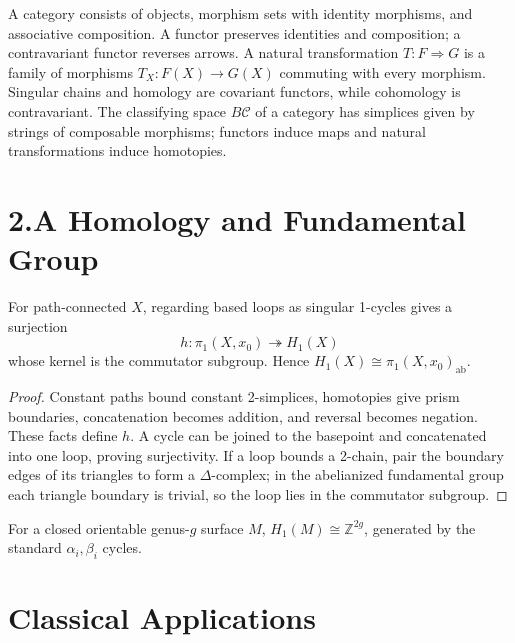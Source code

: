 A category consists of objects, morphism sets with identity morphisms, and associative composition.  A functor preserves identities and composition; a contravariant functor reverses arrows.  A natural transformation $T:F\Rightarrow G$ is a family of morphisms $T_X:F(X)\to G(X)$ commuting with every morphism.  Singular chains and homology are covariant functors, while cohomology is contravariant.  The classifying space $B\mathcal C$ of a category has simplices given by strings of composable morphisms; functors induce maps and natural transformations induce homotopies.

\section{2.A Homology and Fundamental Group}

\begin{theorem}
\label{thm:hurewicz-dimension-1}
For path-connected $X$, regarding based loops as singular 1-cycles gives a surjection
\[
h:\pi_1(X,x_0)\twoheadrightarrow H_1(X)
\]
whose kernel is the commutator subgroup.  Hence $H_1(X)\cong\pi_1(X,x_0)_{\mathrm{ab}}$.
\end{theorem}
\begin{proof}
\sketch Constant paths bound constant 2-simplices, homotopies give prism boundaries, concatenation becomes addition, and reversal becomes negation.  These facts define $h$.  A cycle can be joined to the basepoint and concatenated into one loop, proving surjectivity.  If a loop bounds a 2-chain, pair the boundary edges of its triangles to form a $\Delta$-complex; in the abelianized fundamental group each triangle boundary is trivial, so the loop lies in the commutator subgroup.
\end{proof}

\begin{example}
\label{ex:h1-closed-orientable-surface}
For a closed orientable genus-$g$ surface $M$, $H_1(M)\cong\mathbb{Z}^{2g}$, generated by the standard $\alpha_i,\beta_i$ cycles.
\end{example}

\section{Classical Applications}

